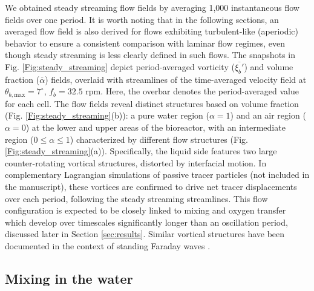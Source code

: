 \documentclass[final,3p,times,twocolumn,authoryear]{elsarticle}
\theoremstyle{definition}
\begin{document}
We obtained steady streaming flow fields by averaging 1,000 instantaneous flow fields over one period. It is worth noting that in the following sections, an averaged flow field is also derived for flows exhibiting turbulent-like (aperiodic) behavior to ensure a consistent comparison with laminar flow regimes, even though steady streaming is less clearly defined in such flows. The snapshots in Fig. \ref{Fig:steady_streaming} depict period-averaged vorticity ($\overline{\xi_b'}$) and volume fraction ($\overline{\alpha}$) fields, overlaid with streamlines of the time-averaged velocity field at $\theta_{b,\textrm{max}} = 7^\circ$, $f_b = 32.5$ rpm. Here, the overbar denotes the period-averaged value for each cell. The flow fields reveal distinct structures based on volume fraction (Fig. \ref{Fig:steady_streaming}(b)): a pure water region ($\alpha=1$) and an air region ($\alpha=0$) at the lower and upper areas of the bioreactor, with an intermediate region ($0 \leq \alpha \leq 1$) characterized by different flow structures (Fig. \ref{Fig:steady_streaming}(a)). Specifically, the liquid side features two large counter-rotating vortical structures, distorted by interfacial motion. In complementary Lagrangian simulations of passive tracer particles (not included in the manuscript), these vortices are confirmed to drive net tracer displacements over each period, following the steady streaming streamlines. This flow configuration is expected to be closely linked to mixing and oxygen transfer which develop over timescales significantly longer than an oscillation period, discussed later in Section \ref{sec:results}. Similar vortical structures have been documented in the context of standing Faraday waves \citep{Perinet2017,Alarcon2020}.


\subsection{Mixing in the water} \label{subsec:mixing}
\end{document}
